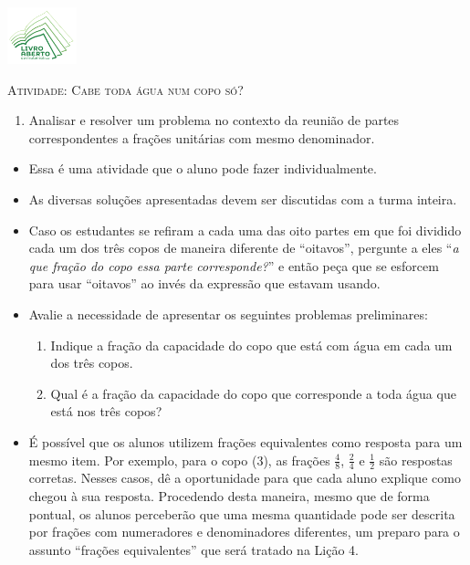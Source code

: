 \documentclass[10 pt,usenames,dvipsnames, oneside]{article}
\begin{document}
\begin{center}
  \begin{minipage}[l]{3cm}
\includegraphics[width=2cm]{logo}    
\end{minipage}\hfill
\begin{minipage}[r]{.8\textwidth}
 {\Large \scshape Atividade: Cabe toda água num copo só?
}  
\end{minipage}
\end{center}
\vspace{.2cm}

\ifdefined\prof
\begin{goals}
\begin{enumerate}

    \item       Analisar e resolver um problema no contexto da reunião de partes correspondentes a frações unitárias com mesmo denominador.

\end{enumerate}
\tcblower

    \begin{itemize} %
    \item Essa é uma atividade que o aluno pode fazer individualmente.
    \item As diversas soluções apresentadas devem ser discutidas com a turma inteira.
    \item Caso os estudantes se refiram a cada uma das oito partes em que foi dividido cada um dos três copos de maneira diferente de ``oitavos'', pergunte a eles ``\textit{a que fração do copo essa parte corresponde?}'' e então peça que se esforcem para usar ``oitavos'' ao invés da expressão que estavam usando.
    \item Avalie a necessidade de apresentar os seguintes problemas preliminares:
      \begin{enumerate}
      \item Indique a fração da capacidade do copo que está com água em cada um dos três copos.
      \item Qual é a fração da capacidade do copo que corresponde a toda água que está nos três copos?
      \end{enumerate}
    \item É possível que os alunos utilizem frações equivalentes como resposta para um mesmo item. Por exemplo, para o copo (3), as frações $\frac{4}{8}$, $\frac{2}{4}$ e $\frac{1}{2}$ são respostas corretas. Nesses casos, dê a oportunidade para que cada aluno explique como chegou à sua resposta. Procedendo desta maneira, mesmo que de forma pontual, os alunos perceberão que uma mesma quantidade pode ser descrita por frações com numeradores e denominadores diferentes, um preparo para o assunto ``frações equivalentes'' que será tratado na Lição 4.
\end{itemize} %

\end{goals}
\end{document}
